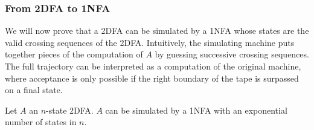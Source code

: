 \subsubsection{From 2DFA to 1NFA}
We will now prove that a 2DFA can be simulated by a 1NFA whose states are the valid crossing sequences of the 2DFA.
Intuitively, the simulating machine puts together pieces of the computation of $A$ by guessing successive crossing sequences. The full trajectory can be interpreted as a computation of the original machine, where acceptance is only possible if the right boundary of the tape is surpassed on a final state.
\begin{thrm}\label{thm:2DFAto1NFA}
	Let $A$ an $n$-state 2DFA. $A$ can be simulated by a 1NFA with an exponential number of states in $n$.
\end{thrm}
